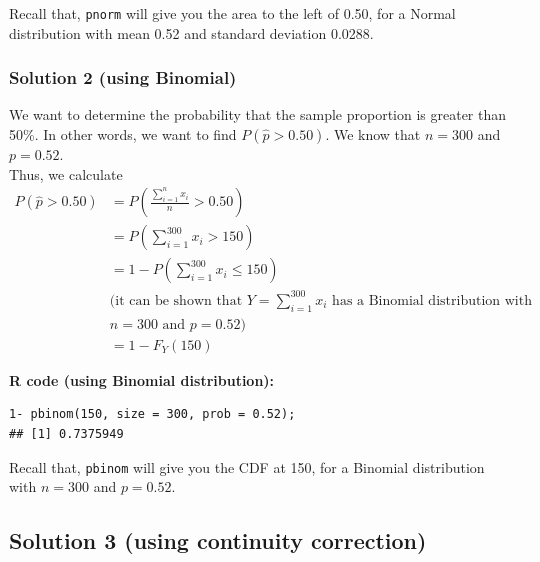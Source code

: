 \begin{example}
Recall that, \texttt{pnorm} will give you the area to the left of 0.50, for a Normal distribution with mean 0.52 and standard deviation 0.0288.
\subsubsection*{Solution 2 (using Binomial)}

We want to determine the probability that the sample proportion is greater than 50\%. In other words, we want to find $P(\hat{p} > 0.50)$. We know that 
$n = 300$ and $p = 0.52$. \\
Thus, we calculate
\begin{align*}
P(\hat{p} > 0.50) &= P\left(\frac{\sum_{i=1}^{n} x_i}{n} > 0.50\right) \\
&= P\left(\sum_{i=1}^{300} x_i > 150\right) \\
&= 1 - P\left(\sum_{i=1}^{300} x_i \leq 150\right) \\
&\text{(it can be shown that } Y = \sum_{i=1}^{300} x_i \text{ has a Binomial distribution with} \\
&n = 300 \text{ and } p = 0.52\text{)} \\
&= 1 - F_Y(150)
\end{align*}

\vspace{0.5em}
\noindent\textbf{R code (using Binomial distribution):}
\begin{tcolorbox}[colback=gray!10, colframe=black!45, arc=2mm]
\begin{verbatim}
1- pbinom(150, size = 300, prob = 0.52);
## [1] 0.7375949
\end{verbatim}
\end{tcolorbox}
Recall that, \texttt{pbinom} will give you the CDF at 150, for a Binomial distribution with $n = 300$ and $p = 0.52$.

\subsection*{Solution 3 (using continuity correction)}



\end{example}
